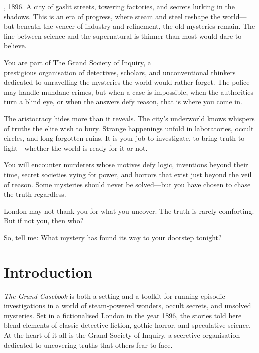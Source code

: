 
\begin{WyrdSettingHeading}
    , 1896. A city of gaslit streets, towering factories, and secrets lurking in the shadows. This is an era of progress, where steam and steel reshape the world—but beneath the veneer of industry and refinement, the old mysteries remain. The line between science and the supernatural is thinner than most would dare to believe.

    You are part of The Grand Society of Inquiry, a\\ prestigious organisation of detectives, scholars, and unconventional thinkers dedicated to unravelling the mysteries the world would rather forget. The police may handle mundane crimes, but when a case is impossible, when the authorities turn a blind eye, or when the answers defy reason, that is where you come in.

    The aristocracy hides more than it reveals. The city's underworld knows whispers of truths the elite wish to bury. Strange happenings unfold in laboratories, occult circles, and long-forgotten ruins. It is your job to investigate, to bring truth to light—whether the world is ready for it or not.

    You will encounter murderers whose motives defy logic, inventions beyond their time, secret societies vying for power, and horrors that exist just beyond the veil of reason. Some mysteries should never be solved—but you have chosen to chase the truth regardless.

    London may not thank you for what you uncover. The truth is rarely comforting. But if not you, then who?

    So, tell me: What mystery has found its way to your doorstep tonight?
\end{WyrdSettingHeading}

\section{Introduction}

\textit{The Grand Casebook} is both a setting and a toolkit for running episodic investigations in a world of steam-powered wonders, occult secrets, and unsolved mysteries. Set in a fictionalised London in the year 1896, the stories told here blend elements of classic detective fiction, gothic horror, and speculative science. At the heart of it all is the Grand Society of Inquiry, a secretive organisation dedicated to uncovering truths that others fear to face.

